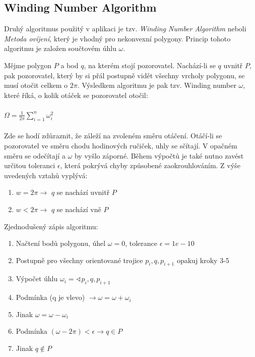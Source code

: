\documentclass[a4paper, 12pt]{article}
\begin{document}
\subsection{Winding Number Algorithm}
Druhý algoritmus použitý v aplikaci je tzv. \textit{Winding Number Algorithm} neboli \textit{Metoda ovíjení}, který je vhodný pro nekonvexní polygony. Princip tohoto algoritmu je založen součtovém úhlu $\omega$.

Mějme polygon $P$ a bod $q$, na kterém stojí pozorovatel. Nachází-li se $q$ uvnitř $P$, pak pozorovatel, který by si přál postupně vidět všechny vrcholy polygonu, se musí otočit celkem o $2\pi$. Výsledkem algoritmu je pak tzv. Winding number $\omega$, které říká, o kolik otáček se pozorovatel otočil: \\ \\
$\Omega = \frac{1}{2\pi} \sum_{i=1}^n \omega_i^2$\\ \\
Zde se hodí zdůraznit, že záleží na zvoleném směru otáčení. Otáčí-li se pozorovatel ve směru chodu hodinových ručiček, uhly se sčítají. V opačném směru se odečítají a $\omega$ by vyšlo záporné. Během výpočtů je také nutno zavést určitou toleranci $\epsilon$, která pokrývá chyby způsobené zaokrouhlováním.
Z výše uvedených vztahů vyplývá:
\begin{enumerate} 
\item $w = 2\pi \rightarrow$ $q$ se nachází uvnitř $P$
\item  $w < 2\pi \rightarrow$ $q$ se nachází vně $P$
\end{enumerate}

Zjednodušený zápis algoritmu:

\begin{enumerate}
\item Načtení bodů polygonu, úhel $\omega = 0$, tolerance $\epsilon = 1e-10$
\item Postupně pro všechny orientované trojice $p_i, q, p_{i+1}$ opakuj kroky 3-5
\item 	Výpočet úhlu $\omega_i = \sphericalangle p_i, q, p_{i+1}$
\item 	Podmínka (q je vlevo) $\rightarrow \omega = \omega + \omega_i$
\item 	Jinak $\omega = \omega - \omega_i$
\item Podmínka $(\omega - 2\pi) < \epsilon \rightarrow q \in P$
\item Jinak  $ q { \not \in } P $
\end{enumerate}
\end{document}

